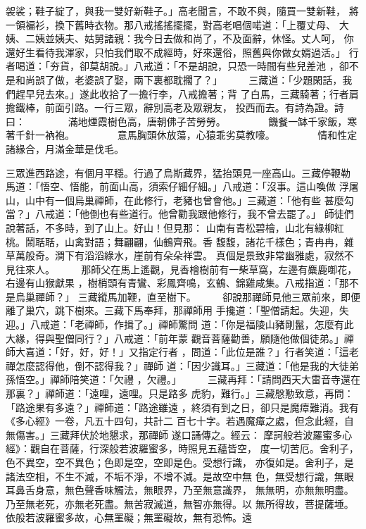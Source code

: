 \begin{pinyinscope}
{袈裟；鞋子綻了，與我一雙好新鞋子。」高老聞言，不敢不與，隨買一雙新鞋，
將一領褊衫，換下舊時衣物。那八戒搖搖擺擺，對高老唱個喏道：「上覆丈母、
大姨、二姨並姨夫、姑舅諸親：我今日去做和尚了，不及面辭，休怪。丈人呵，
你還好生看待我渾家，只怕我們取不成經時，好來還俗，照舊與你做女婿過活。」
行者喝道：「夯貨，卻莫胡說。」八戒道：「不是胡說，只恐一時間有些兒差池
，卻不是和尚誤了做，老婆誤了娶，兩下裏都耽擱了？」
　　
三藏道：「少題閑話，我們趕早兒去來。」遂此收拾了一擔行李，八戒擔著；背
了白馬，三藏騎著；行者肩擔鐵棒，前面引路。一行三眾，辭別高老及眾親友，
投西而去。有詩為證。詩曰：
　　　　滿地煙霞樹色高，唐朝佛子苦勞勞。
　　　　饑餐一缽千家飯，寒著千針一衲袍。
　　　　意馬胸頭休放蕩，心猿乖劣莫教嚎。
　　　　情和性定諸緣合，月滿金華是伐毛。

三眾進西路途，有個月平穩。行過了烏斯藏界，猛抬頭見一座高山。三藏停鞭勒
馬道：「悟空、悟能，前面山高，須索仔細仔細。」八戒道：「沒事。這山喚做
浮屠山，山中有一個烏巢禪師，在此修行，老豬也曾會他。」三藏道：「他有些
甚麼勾當？」八戒道：「他倒也有些道行。他曾勸我跟他修行，我不曾去罷了。」
師徒們說著話，不多時，到了山上。好山！但見那：
山南有青松碧檜，山北有綠柳紅桃。鬧聒聒，山禽對語；舞翩翩，仙鶴齊飛。香
馥馥，諸花千樣色；青冉冉，雜草萬般奇。澗下有滔滔綠水，崖前有朵朵祥雲。
真個是景致非常幽雅處，寂然不見往來人。
　　
那師父在馬上遙觀，見香檜樹前有一柴草窩，左邊有麋鹿啣花，右邊有山猴獻果
，樹梢頭有青鸞、彩鳳齊鳴，玄鶴、錦雞咸集。八戒指道：「那不是烏巢禪師？」
三藏縱馬加鞭，直至樹下。
　　
卻說那禪師見他三眾前來，即便離了巢穴，跳下樹來。三藏下馬奉拜，那禪師用
手攙道：「聖僧請起。失迎，失迎。」八戒道：「老禪師，作揖了。」禪師驚問
道：「你是福陵山豬剛鬣，怎麼有此大緣，得與聖僧同行？」八戒道：「前年蒙
觀音菩薩勸善，願隨他做個徒弟。」禪師大喜道：「好，好，好！」又指定行者
，問道：「此位是誰？」行者笑道：「這老禪怎麼認得他，倒不認得我？」禪師
道：「因少識耳。」三藏道：「他是我的大徒弟孫悟空。」禪師陪笑道：「欠禮
，欠禮。」
　　
三藏再拜：「請問西天大雷音寺還在那裏？」禪師道：「遠哩，遠哩。只是路多
虎豹，難行。」三藏慇懃致意，再問：「路途果有多遠？」禪師道：「路途雖遠
，終須有到之日，卻只是魔瘴難消。我有《多心經》一卷，凡五十四句，共計二
百七十字。若遇魔瘴之處，但念此經，自無傷害。」三藏拜伏於地懇求，那禪師
遂口誦傳之。經云：
摩訶般若波羅蜜多心經》：觀自在菩薩，行深般若波羅蜜多，時照見五蘊皆空，
度一切苦厄。舍利子，色不異空，空不異色；色即是空，空即是色。受想行識，
亦復如是。舍利子，是諸法空相，不生不滅，不垢不淨，不增不減。是故空中無
色，無受想行識，無眼耳鼻舌身意，無色聲香味觸法，無眼界，乃至無意識界，
無無明，亦無無明盡。乃至無老死，亦無老死盡。無苦寂滅道，無智亦無得。以
無所得故，菩提薩埵。依般若波羅蜜多故，心無罣礙；無罣礙故，無有恐怖。遠
}
\end{pinyinscope}
